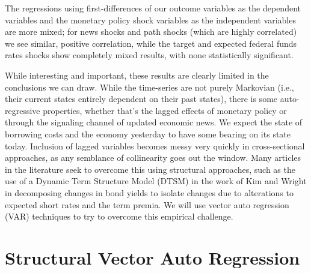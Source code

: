 \documentclass[12pt,final]{article}
\begin{document}
The regressions using first-differences of our outcome variables as the dependent variables and the monetary policy shock variables as the independent variables are more mixed; for news shocks and path shocks (which are highly correlated) we see similar, positive correlation, while the target and expected federal funds rates shocks show completely mixed results, with none statistically significant.

While interesting and important, these results are clearly limited in the conclusions we can draw. While the time-series are not purely Markovian (i.e., their current states entirely dependent on their past states), there is some auto-regressive properties, whether that's the lagged effects of monetary policy or through the signaling channel of updated economic news. We expect the state of borrowing costs and the economy yesterday to have some bearing on its state today. Inclusion of lagged variables becomes messy very quickly in cross-sectional approaches, as any semblance of collinearity goes out the window. Many articles in the literature seek to overcome this using structural approaches, such as the use of a Dynamic Term Structure Model (DTSM) in the work of Kim and Wright in decomposing changes in bond yields to isolate changes due to alterations to expected short rates and the term premia. \citep{Kim2005} We will use vector auto regression (VAR) techniques to try to overcome this empirical challenge.

\section{Structural Vector Auto Regression}
\end{document}

